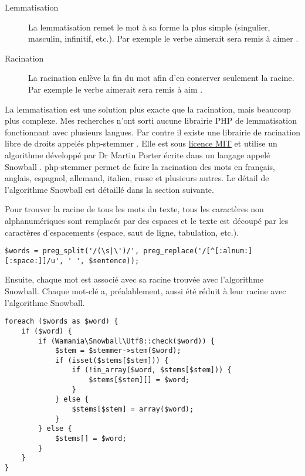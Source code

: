 \begin{description}
  \item[Lemmatisation]
  
  La lemmatisation remet le mot à sa forme la plus simple (singulier, masculin, infinitif, etc.).
  Par exemple le verbe \og aimerait \fg{} sera remis à \og aimer \fg{}.
  
  \item[Racination]
  
  La racination enlève la fin du mot afin d'en conserver seulement la racine.
  Par exemple le verbe \og aimerait \fg{} sera remis à \og aim \fg{}.
\end{description}

La lemmatisation est une solution plus exacte que la racination, mais beaucoup plus complexe.
Mes recherches n'ont sorti aucune librairie PHP de lemmatisation fonctionnant avec plusieurs langues.
Par contre il existe une librairie de racination libre de droits appelés php-stemmer \cite{phpstemmer}.
Elle est sous \href{https://raw.githubusercontent.com/wamania/php-stemmer/master/LICENSE}{licence MIT} et utilise un algorithme développé par Dr Martin Porter écrite dans un langage appelé Snowball \cite{snowball}.
php-stemmer permet de faire la racination des mots en français, anglais, espagnol, allemand, italien, russe et plusieurs autres.
Le détail de l'algorithme Snowball est détaillé dans la section suivante.

Pour trouver la racine de tous les mots du texte, tous les caractères non alphanumériques sont remplacés par des espaces et le texte est découpé par les caractères d'espacements (espace, saut de ligne, tabulation, etc.).

\begin{lstlisting}[frame=l]
$words = preg_split('/(\s|\')/', preg_replace('/[^[:alnum:][:space:]]/u', ' ', $sentence));
\end{lstlisting}

Ensuite, chaque mot est associé avec sa racine trouvée avec l'algorithme Snowball.
Chaque mot-clé a, préalablement, aussi été réduit à leur racine avec l'algorithme Snowball.

\begin{lstlisting}[frame=l]
foreach ($words as $word) {
	if ($word) {
		if (Wamania\Snowball\Utf8::check($word)) {
			$stem = $stemmer->stem($word);
			if (isset($stems[$stem])) {
				if (!in_array($word, $stems[$stem])) {
					$stems[$stem][] = $word;
				}
			} else {
				$stems[$stem] = array($word);
			}
		} else {
			$stems[] = $word;
		}
	}
}
\end{lstlisting}

